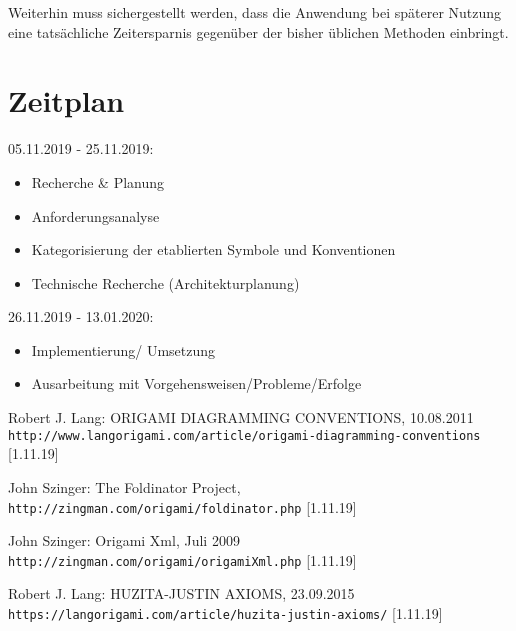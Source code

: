 \documentclass[12pt]{article}
\begin{document}
Weiterhin muss sichergestellt werden, dass die Anwendung bei späterer Nutzung eine tatsächliche Zeitersparnis gegenüber der bisher üblichen Methoden einbringt.

\section{Zeitplan}

05.11.2019 - 25.11.2019: 
\begin{itemize}
\item Recherche \& Planung
\item Anforderungsanalyse
\item Kategorisierung der etablierten Symbole und Konventionen
\item Technische Recherche (Architekturplanung)
\end{itemize}
26.11.2019 - 13.01.2020:
\begin{itemize}
\item Implementierung/ Umsetzung
\item Ausarbeitung mit Vorgehensweisen/Probleme/Erfolge
\end{itemize}


\newpage


\begin{thebibliography}{9}
Robert J. Lang: ORIGAMI DIAGRAMMING CONVENTIONS, 10.08.2011
\\\texttt{http://www.langorigami.com/article/origami-diagramming-conventions} [1.11.19]

John Szinger: The Foldinator Project,
\\\texttt{http://zingman.com/origami/foldinator.php} [1.11.19]

John Szinger: Origami Xml, Juli 2009
\\\texttt{http://zingman.com/origami/origamiXml.php} [1.11.19]

Robert J. Lang: HUZITA-JUSTIN AXIOMS, 23.09.2015
\\\texttt{https://langorigami.com/article/huzita-justin-axioms/} [1.11.19]
\end{thebibliography}


\listoffigures
\end{document}
